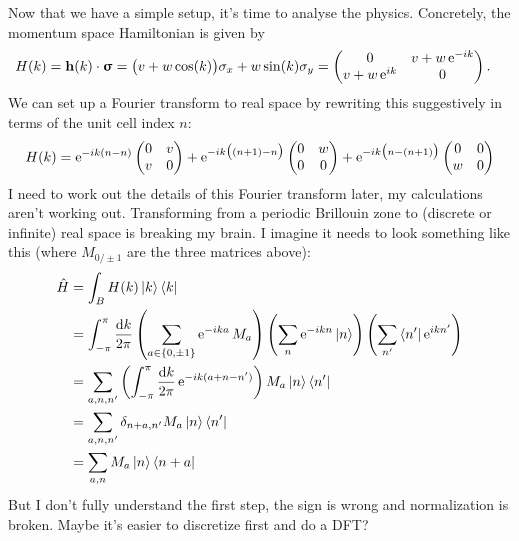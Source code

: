 Now that we have a simple setup, it's time to analyse the physics. Concretely, the momentum space Hamiltonian is given by
\begin{align*}
	H(k) &= \vb{h}(k)\cdot\bm{\upsigma} = \big(v + w\cos(k)\big)\sigma_x + w\sin(k)\sigma_y = \begin{pmatrix}
		0 & v + w\operatorname{e}^{-ik} \\
		v + w\operatorname{e}^{ik} & 0
	\end{pmatrix}.
\end{align*}
We can set up a Fourier transform to real space by rewriting this suggestively in terms of the unit cell index $n$:
\[
	H(k) = \operatorname{e}^{-ik(n-n)}\begin{pmatrix}
		0 & v \\
		v & 0
	\end{pmatrix} + \operatorname{e}^{-ik\big((n+1)-n\big)}\begin{pmatrix}
		0 & w \\
		0 & 0
	\end{pmatrix} + \operatorname{e}^{-ik\big(n-(n+1)\big)}\begin{pmatrix}
		0 & 0 \\
		w & 0
	\end{pmatrix}
\]
{\color{red} I need to work out the details of this Fourier transform later, my calculations aren't working out. Transforming from a periodic Brillouin zone to (discrete or infinite) real space is breaking my brain. I imagine it needs to look something like this (where $M_{0/\pm1}$ are the three matrices above):
\begin{align*}
	\hat{H} &= \int_B H(k) \ket{k}\bra{k} \\
		&= \int_{-\pi}^{\pi}\frac{\dd{k}}{2\pi} \left(\sum_{a\in\{0,\pm1\}}\operatorname{e}^{-ika}M_a\right) \left(\sum_{n}\operatorname{e}^{-ikn}\ket{n}\right) \left(\sum_{n'}\bra{n'}\operatorname{e}^{ikn'}\right) \\
		&= \sum_{a,n,n'}\left(\int_{-\pi}^{\pi}\frac{\dd{k}}{2\pi}\operatorname{e}^{-ik(a+n-n')}\right)M_a\ket{n}\bra{n'} \\
		&= \sum_{a,n,n'}\delta_{n+a,n'}M_a\ket{n}\bra{n'} \\
		&= \sum_{a,n}M_a\ket{n}\bra{n+a}
\end{align*}
But I don't fully understand the first step, the sign is wrong and normalization is broken. Maybe it's easier to discretize first and do a DFT?}

